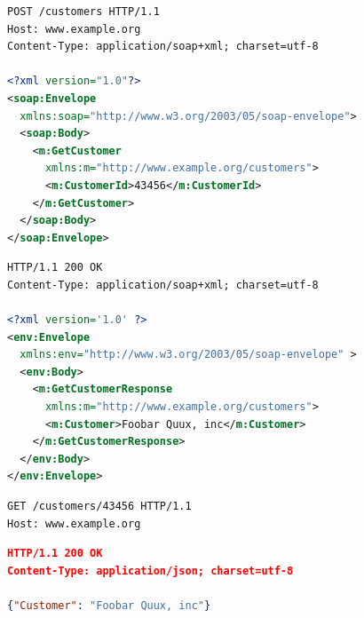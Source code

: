 \begin{samepage}
\begin{lstlisting}[language=xml,label=lst:background:apis:soap-request,caption={[An example SOAP request]A \gls{soap} \glsac{http} POST consumer request to retrieve customer record \#43456 from a web service provider. Source: \citep{Ballinger:2014aa}.}]
POST /customers HTTP/1.1
Host: www.example.org
Content-Type: application/soap+xml; charset=utf-8

<?xml version="1.0"?>
<soap:Envelope 
  xmlns:soap="http://www.w3.org/2003/05/soap-envelope">
  <soap:Body>
    <m:GetCustomer 
      xmlns:m="http://www.example.org/customers">
      <m:CustomerId>43456</m:CustomerId>
    </m:GetCustomer>
  </soap:Body>
</soap:Envelope>
\end{lstlisting}
\begin{lstlisting}[language=xml,label=lst:background:apis:soap-response,caption={[An example SOAP response]The \gls{soap} \glsac{http} service provider response for \cref{lst:background:apis:soap-request}. Source: \citep{Ballinger:2014aa}.}]
HTTP/1.1 200 OK
Content-Type: application/soap+xml; charset=utf-8

<?xml version='1.0' ?>
<env:Envelope 
  xmlns:env="http://www.w3.org/2003/05/soap-envelope" >
  <env:Body>
    <m:GetCustomerResponse 
      xmlns:m="http://www.example.org/customers">
      <m:Customer>Foobar Quux, inc</m:Customer>
    </m:GetCustomerResponse>
  </env:Body>
</env:Envelope>
\end{lstlisting}
\end{samepage}

\newpage
\begin{samepage}
\begin{lstlisting}[label=lst:background:apis:rest-request,caption={[An example RESTful request]An equivalent \glsac{http} consumer request to that of \cref{lst:background:apis:soap-request}, but using \gls{rest}. Source: \citep{Ballinger:2014aa}.}]
GET /customers/43456 HTTP/1.1
Host: www.example.org
\end{lstlisting}
\begin{lstlisting}[language=json,label=lst:background:apis:rest-response,caption={[An example RESTful response]The \gls{rest} \glsac{http} service provider response for \cref{lst:background:apis:rest-request}. Source: \citep{Ballinger:2014aa}.}]
HTTP/1.1 200 OK
Content-Type: application/json; charset=utf-8

{"Customer": "Foobar Quux, inc"}
\end{lstlisting}
\end{samepage}

